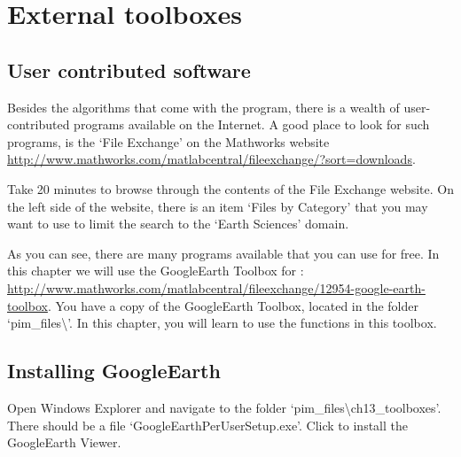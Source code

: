 \chapter{External toolboxes}
\thispagestyle{fancy}



\section{User contributed software}
Besides the algorithms that come with the \MATLAB{} program, there is a wealth of user-contributed programs available on the Internet. A good place to look for such programs, is the `File Exchange' on the Mathworks website \url{http://www.mathworks.com/matlabcentral/fileexchange/?sort=downloads}.

\begin{action}
Take 20 minutes to browse through the contents of the File Exchange website. On the left side of the website, there is an item `Files by Category' that you may want to use to limit the search to the `Earth Sciences' domain. 
\end{action}
As you can see, there are many programs available that you can use for free. In this chapter we will use the GoogleEarth Toolbox for \MATLAB{}: \url{http://www.mathworks.com/matlabcentral/fileexchange/12954-google-earth-toolbox}. You have a copy of the GoogleEarth Toolbox, located in the folder `pim\_files\textbackslash{}'. In this chapter, you will learn to use the functions in this toolbox.

\label{pr:googleearth}

\section{Installing GoogleEarth}
\begin{action}
Open Windows Explorer and navigate to the folder `pim\_files\textbackslash{}ch13\_toolboxes'. There should be a file `GoogleEarthPerUserSetup.exe'. Click to install the GoogleEarth Viewer.
\end{action}

